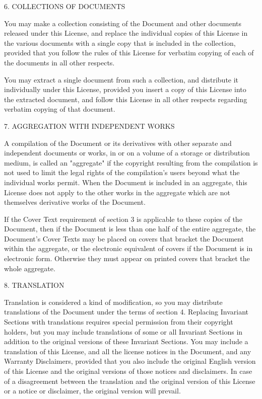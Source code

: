 \documentclass[letterpaper]{book}
\begin{document}
6. COLLECTIONS OF DOCUMENTS

You may make a collection consisting of the Document and other
documents released under this License, and replace the individual
copies of this License in the various documents with a single copy
that is included in the collection, provided that you follow the rules
of this License for verbatim copying of each of the documents in all
other respects.

You may extract a single document from such a collection, and
distribute it individually under this License, provided you insert a
copy of this License into the extracted document, and follow this
License in all other respects regarding verbatim copying of that
document.

7. AGGREGATION WITH INDEPENDENT WORKS

A compilation of the Document or its derivatives with other separate
and independent documents or works, in or on a volume of a storage or
distribution medium, is called an "aggregate" if the copyright
resulting from the compilation is not used to limit the legal rights
of the compilation's users beyond what the individual works permit.
When the Document is included in an aggregate, this License does not
apply to the other works in the aggregate which are not themselves
derivative works of the Document.

If the Cover Text requirement of section 3 is applicable to these
copies of the Document, then if the Document is less than one half of
the entire aggregate, the Document's Cover Texts may be placed on
covers that bracket the Document within the aggregate, or the
electronic equivalent of covers if the Document is in electronic form.
Otherwise they must appear on printed covers that bracket the whole
aggregate.

8. TRANSLATION

Translation is considered a kind of modification, so you may
distribute translations of the Document under the terms of section 4.
Replacing Invariant Sections with translations requires special
permission from their copyright holders, but you may include
translations of some or all Invariant Sections in addition to the
original versions of these Invariant Sections. You may include a
translation of this License, and all the license notices in the
Document, and any Warranty Disclaimers, provided that you also include
the original English version of this License and the original versions
of those notices and disclaimers. In case of a disagreement between
the translation and the original version of this License or a notice
or disclaimer, the original version will prevail.
\end{document}
